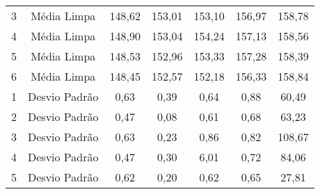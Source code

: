 \begin{table}[]
\begin{tabular}{|c|c|ccccc|}
3                         & Média Limpa                                                                & 148,62                     & 153,01                     & 153,10                     & 156,97                     & 158,78                      \\
4                         & Média Limpa                                                                & 148,90                     & 153,04                     & 154,24                     & 157,13                     & 158,56                      \\
5                         & Média Limpa                                                                & 148,53                     & 152,96                     & 153,33                     & 157,28                     & 158,39                      \\
6                         & Média Limpa                                                                & 148,45                     & 152,57                     & 152,18                     & 156,33                     & 158,84                      \\ \hline
1                         & Desvio Padrão                                                              & 0,63                       & 0,39                       & 0,64                       & 0,88                       & 60,49                       \\
2                         & Desvio Padrão                                                              & 0,47                       & 0,08                       & 0,61                       & 0,68                       & 63,23                       \\
3                         & Desvio Padrão                                                              & 0,63                       & 0,23                       & 0,86                       & 0,82                       & 108,67                      \\
4                         & Desvio Padrão                                                              & 0,47                       & 0,30                       & 6,01                       & 0,72                       & 84,06                       \\
5                         & Desvio Padrão                                                              & 0,62                       & 0,20                       & 0,62                       & 0,65                       & 27,81                       \\

\end{tabular}
\end{table}
